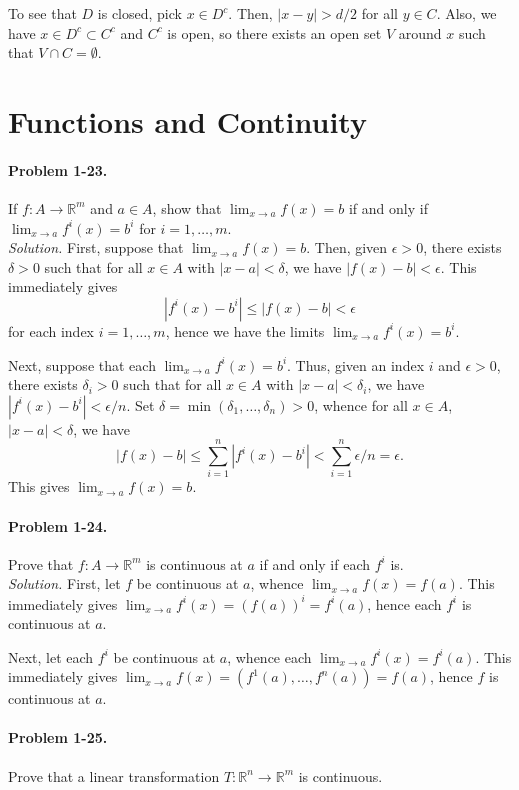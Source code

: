 \documentclass[11pt]{report}
\newcommand{\R}{\mathbb{R}}
\newcommand{\problem}[1]{\paragraph{Problem #1.}}
\newcommand{\solution}{\noindent\textit{Solution.} }
\begin{document}
    To see that $D$ is closed, pick $x \in D^c$. Then, $|x - y| > d / 2$
    for all $y \in C$. Also, we have $x \in D^c \subset C^c$ and $C^c$ is open, so
    there exists an open set $V$ around $x$ such that $V \cap C = \emptyset$.



    \section{Functions and Continuity}

    \problem{1-23} If $f\colon A \to \R^m$ and $a \in A$, show that $\lim_{x \to a}
    f(x) = b$ if and only if $\lim_{x \to a} f^i(x) = b^i$ for $i = 1, \dots, m$. \\

    \solution First, suppose that $\lim_{x \to a} f(x) = b$. Then, given $\epsilon >
    0$, there exists $\delta > 0$ such that for all $x \in A$ with $|x - a| <
    \delta$, we have $|f(x) - b| < \epsilon$. This immediately gives \[
        |f^i(x) - b^i| \leq |f(x) - b| < \epsilon
    \] for each index $i = 1, \dots, m$, hence we have the limits $\lim_{x \to a}
    f^i(x) = b^i$.

    Next, suppose that each $\lim_{x \to a} f^i(x) = b^i$. Thus, given an index $i$
    and $\epsilon > 0$, there exists $\delta_i > 0$ such that for all $x \in A$ with
    $|x - a| < \delta_i$, we have $|f^i(x) - b^i| < \epsilon / n$. Set $\delta =
    \min(\delta_1, \dots, \delta_n) > 0$, whence for all $x \in A$, $|x - a| <
    \delta$, we have \[
        |f(x) - b| \leq \sum_{i = 1}^n |f^i(x) - b^i| < \sum_{i = 1}^n \epsilon / n =
        \epsilon.
    \] This gives $\lim_{x \to a} f(x) = b$.


    \problem{1-24} Prove that $f\colon A \to \R^m$ is continuous at $a$ if and only
    if each $f^i$ is. \\

    \solution First, let $f$ be continuous at $a$, whence $\lim_{x \to a} f(x) =
    f(a)$. This immediately gives $\lim_{x \to a} f^i(x) = (f(a))^i = f^i(a)$, hence
    each $f^i$ is continuous at $a$.

    Next, let each $f^i$ be continuous at $a$, whence each $\lim_{x \to a} f^i(x) =
    f^i(a)$. This immediately gives $\lim_{x \to a} f(x) = (f^1(a), \dots, f^n(a)) =
    f(a)$, hence $f$ is continuous at $a$.


    \problem{1-25} Prove that a linear transformation $T\colon \R^n \to \R^m$ is
    continuous. \\
\end{document}
